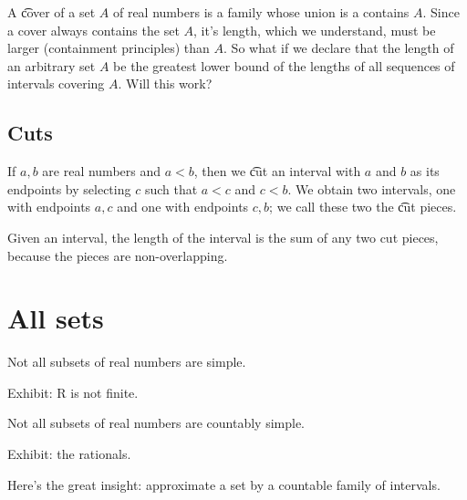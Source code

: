 A \t{cover} of a set $A$ of real numbers is a family whose union is a contains $A$. Since a cover always contains the set $A$, it's length, which we understand, must be larger (containment principles) than $A$.
So what if we declare that the length of an arbitrary set $A$ be the greatest lower bound of the lengths of all sequences of intervals covering $A$. Will this work?

\subsection*{Cuts}

If $a, b$ are real numbers and $a < b$, then we \t{cut} an interval with $a$ and $b$ as its endpoints by selecting $c$ such that $a < c$ and $c < b$.
We obtain two intervals, one with endpoints $a,c$ and one with endpoints $c, b$; we call these two the \t{cut pieces}.

Given an interval, the length of the interval is the sum of any two cut pieces, because the pieces are non-overlapping.

\section*{All sets}

\begin{proposition}
Not all subsets of real numbers are simple.

Exhibit: R is not finite.

\end{proposition}

\begin{proposition}
Not all subsets of real numbers are countably simple.

Exhibit: the rationals.

\end{proposition}

Here's the great insight: approximate a set by a countable family of intervals.
